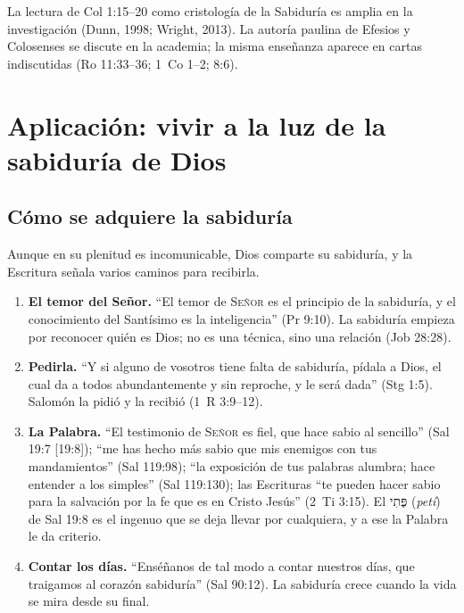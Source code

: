 \documentclass[11pt,letterpaper]{article}
\newcommand{\heb}[1]{\mbox{\foreignlanguage{hebrew}{#1}}}
\newcommand{\SENOR}{\textsc{Señor}}
\begin{document}
\begin{nota}[Precisión]
La lectura de Col 1:15--20 como cristología de la Sabiduría es amplia en la investigación (Dunn, 1998; Wright, 2013). La autoría paulina de Efesios y Colosenses se discute en la academia; la misma enseñanza aparece en cartas indiscutidas (Ro 11:33--36; 1~Co 1--2; 8:6).
\end{nota}

\section{Aplicación: vivir a la luz de la sabiduría de Dios}

\subsection{Cómo se adquiere la sabiduría}

Aunque en su plenitud es incomunicable, Dios comparte su sabiduría, y la Escritura señala varios caminos para recibirla.

\begin{enumerate}
\item \textbf{El temor del Señor.} ``El temor de \SENOR{} es el principio de la sabiduría, y el conocimiento del Santísimo es la inteligencia'' (Pr 9:10). La sabiduría empieza por reconocer quién es Dios; no es una técnica, sino una relación (Job 28:28).
\item \textbf{Pedirla.} ``Y si alguno de vosotros tiene falta de sabiduría, pídala a Dios, el cual da a todos abundantemente y sin reproche, y le será dada'' (Stg 1:5). Salomón la pidió y la recibió (1~R 3:9--12).
\item \textbf{La Palabra.} ``El testimonio de \SENOR{} es fiel, que hace sabio al sencillo'' (Sal 19:7 [19:8]); ``me has hecho más sabio que mis enemigos con tus mandamientos'' (Sal 119:98); ``la exposición de tus palabras alumbra; hace entender a los simples'' (Sal 119:130); las Escrituras ``te pueden hacer sabio para la salvación por la fe que es en Cristo Jesús'' (2~Ti 3:15). El \heb{פֶּתִי} (\emph{petí}) de Sal 19:8 es el ingenuo que se deja llevar por cualquiera, y a ese la Palabra le da criterio.
\item \textbf{Contar los días.} ``Enséñanos de tal modo a contar nuestros días, que traigamos al corazón sabiduría'' (Sal 90:12). La sabiduría crece cuando la vida se mira desde su final.
\end{enumerate}
\end{document}
